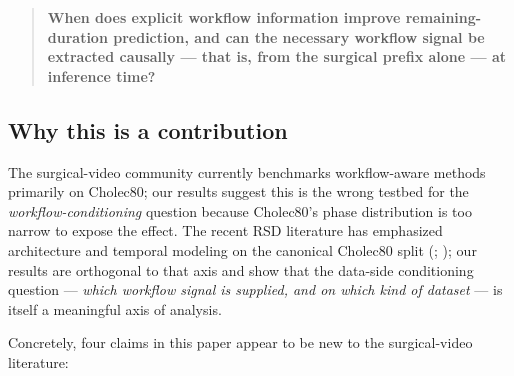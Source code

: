 \begin{quote}
\textbf{When does explicit workflow information improve
remaining-duration prediction, and can the necessary workflow signal be
extracted causally --- that is, from the surgical prefix alone --- at
inference time?}
\end{quote}

\subsection{Why this is a contribution}\label{why-this-is-a-contribution}

The surgical-video community currently benchmarks workflow-aware methods
primarily on Cholec80; our results suggest this is the wrong testbed for
the \emph{workflow-conditioning} question because Cholec80's phase
distribution is too narrow to expose the effect. The recent RSD
literature has emphasized architecture and temporal modeling on the
canonical Cholec80 split (\citealt{loukas2024translocal}; \citealt{twinanda2019rsdnet});
our results are orthogonal to that axis and show that the data-side
conditioning question --- \emph{which workflow signal is supplied, and
on which kind of dataset} --- is itself a meaningful axis of analysis.

Concretely, four claims in this paper appear to be new to the
surgical-video literature:


